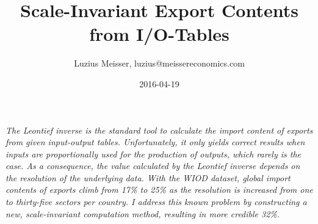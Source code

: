\documentclass[english]{uzhpub}
\begin{document}
\title{Scale-Invariant Export Contents from I/O-Tables}


\author{Luzius Meisser, luzius@meissereconomics.com}

\date{2016-04-19}

\maketitle


\emph{The Leontief inverse is the standard tool to calculate the import content of exports from given input-output tables. Unfortunately, it only yields correct results when inputs are proportionally used for the production of outputs, which rarely is the case. As a consequence, the value calculated by the Leontief inverse depends on the resolution of the underlying data. With the WIOD dataset, global import contents of exports climb from 17\% to 25\% as the resolution is increased from one to thirty-five sectors per country. I address this known problem by constructing a new, scale-invariant computation method, resulting in more credible 32\%.}
\end{document}
